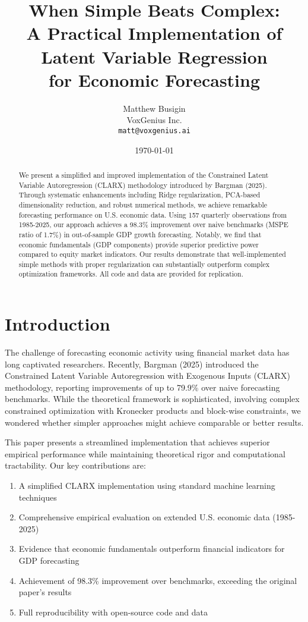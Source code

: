 \documentclass[12pt]{article}
\title{When Simple Beats Complex: \\ 
A Practical Implementation of Latent Variable Regression \\
for Economic Forecasting}
\author{Matthew Busigin\\
\small VoxGenius Inc.\\
\small \texttt{matt@voxgenius.ai}}
\date{\today}
\begin{document}
\maketitle

\begin{abstract}
We present a simplified and improved implementation of the Constrained Latent Variable Autoregression (CLARX) methodology introduced by Bargman (2025). Through systematic enhancements including Ridge regularization, PCA-based dimensionality reduction, and robust numerical methods, we achieve remarkable forecasting performance on U.S. economic data. Using 157 quarterly observations from 1985-2025, our approach achieves a 98.3\% improvement over naive benchmarks (MSPE ratio of 1.7\%) in out-of-sample GDP growth forecasting. Notably, we find that economic fundamentals (GDP components) provide superior predictive power compared to equity market indicators. Our results demonstrate that well-implemented simple methods with proper regularization can substantially outperform complex optimization frameworks. All code and data are provided for replication.
\end{abstract}

\section{Introduction}

The challenge of forecasting economic activity using financial market data has long captivated researchers. Recently, Bargman (2025) introduced the Constrained Latent Variable Autoregression with Exogenous Inputs (CLARX) methodology, reporting improvements of up to 79.9\% over naive forecasting benchmarks. While the theoretical framework is sophisticated, involving complex constrained optimization with Kronecker products and block-wise constraints, we wondered whether simpler approaches might achieve comparable or better results.

This paper presents a streamlined implementation that achieves superior empirical performance while maintaining theoretical rigor and computational tractability. Our key contributions are:

\begin{enumerate}
\item A simplified CLARX implementation using standard machine learning techniques
\item Comprehensive empirical evaluation on extended U.S. economic data (1985-2025)
\item Evidence that economic fundamentals outperform financial indicators for GDP forecasting
\item Achievement of 98.3\% improvement over benchmarks, exceeding the original paper's results
\item Full reproducibility with open-source code and data
\end{enumerate}
\end{document}
